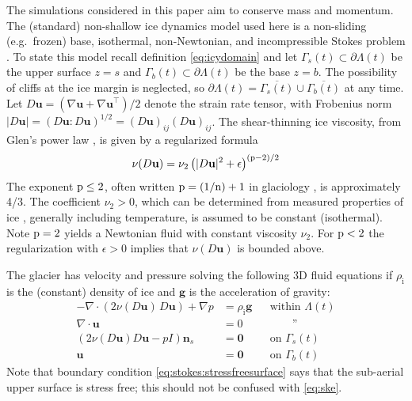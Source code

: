\documentclass[hidelinks,onefignum,onetabnum,final]{siamart220329}  %
\newcommand{\eps}{\epsilon}
\newcommand{\grad}{\nabla}
\newcommand{\bg}{\mathbf{g}}
\newcommand{\bn}{\mathbf{n}}
\newcommand{\bu}{\mathbf{u}}
\newcommand{\bzero}{\bm{0}}
\newcommand{\nn}{{\text{\textnormal{n}}}}
\newcommand{\pp}{{\text{\textnormal{p}}}}
\newcommand{\rhoi}{\rho_{\text{i}}}
\begin{document}
The simulations considered in this paper aim to conserve mass and momentum.   The (standard) non-shallow ice dynamics model used here is a non-sliding (e.g.~frozen) base, isothermal, non-Newtonian, and incompressible Stokes problem \cite{GreveBlatter2009,JouvetRappaz2011,SchoofHewitt2013}.  To state this model recall definition \eqref{eq:icydomain} and let $\Gamma_s(t) \subset \partial \Lambda(t)$ be the upper surface $z=s$ and $\Gamma_b(t) \subset \partial \Lambda(t)$ be the base $z=b$.  The possibility of cliffs at the ice margin is neglected, so $\partial \Lambda(t) = \overline{\Gamma_s(t)} \cup \overline{\Gamma_b(t)}$ at any time.  Let $D\bu=(\grad \bu + \grad \bu^{\top})/2$ denote the strain rate tensor, with Frobenius norm $|D\bu| = (D\bu:D\bu)^{1/2} = (D\bu)_{ij} (D\bu)_{ij}$.  The shear-thinning ice viscosity, from Glen's power law \cite{GreveBlatter2009}, is given by a regularized formula
\begin{equation}
\nu(D\bu) = \nu_2 \left(|D\bu|^2 + \eps\right)^{(\pp-2)/2} \label{eq:glen}
\end{equation}
The exponent $\pp \le 2$, often written $\pp=(1/\nn)+1$ in glaciology \cite{GoldsbyKohlstedt2001}, is approximately 4/3.  The coefficient $\nu_2>0$, which can be determined from measured properties of ice \cite{GreveBlatter2009}, generally including temperature, is assumed to be constant (isothermal).  Note $\pp=2$ yields a Newtonian fluid with constant viscosity $\nu_2$.  For $\pp < 2$ the regularization with $\eps>0$ implies that $\nu(D\bu)$ is bounded above.

The glacier has velocity and pressure solving the following 3D fluid equations if $\rhoi$ is the (constant) density of ice and $\bg$ is the acceleration of gravity:
\begin{subequations}
\label{eq:stokes}
\begin{align}
- \nabla \cdot \left(2 \nu(D\bu)\, D\bu\right) + \nabla p &= \rhoi \bg && \text{within $\Lambda(t)$} \\
\nabla \cdot \bu &= 0 && \qquad \text{''} \label{eq:stokes:incomp} \\
\left(2 \nu(D\bu) D\bu - pI\right) \bn_s &= \bzero && \text{on $\Gamma_s(t)$}\label{eq:stokes:stressfreesurface} \\
\bu  &= \bzero && \text{on $\Gamma_b(t)$}
\end{align}
\end{subequations}
Note that boundary condition \eqref{eq:stokes:stressfreesurface} says that the sub-aerial upper surface is stress free; this should not be confused with \eqref{eq:ske}.
\end{document}
